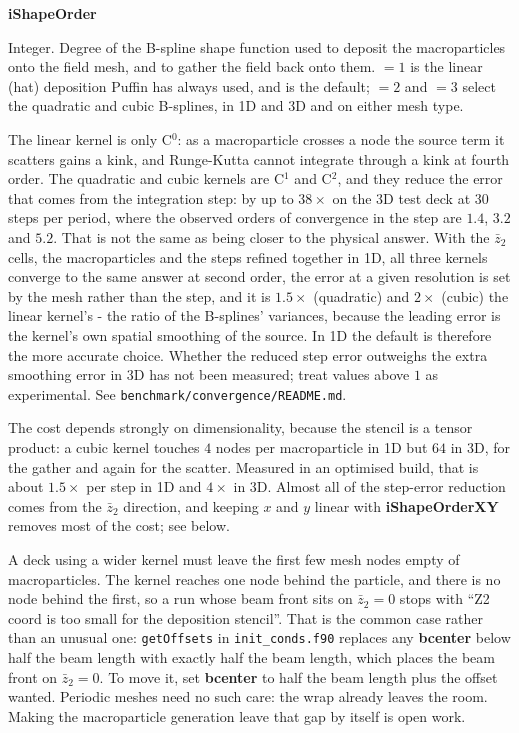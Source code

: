 \documentclass[12pt]{article}%
\begin{document}
{\bf iShapeOrder}

Integer. Degree of the B-spline shape function used to deposit the macroparticles onto the field mesh, and to gather the field back onto them. $=1$ is the linear (hat) deposition Puffin has always used, and is the default; $=2$ and $=3$ select the quadratic and cubic B-splines, in 1D and 3D and on either mesh type.

The linear kernel is only C$^0$: as a macroparticle crosses a node the source term it scatters gains a kink, and Runge-Kutta cannot integrate through a kink at fourth order. The quadratic and cubic kernels are C$^1$ and C$^2$, and they reduce the error that comes from the integration step: by up to $38\times$ on the 3D test deck at $30$ steps per period, where the observed orders of convergence in the step are $1.4$, $3.2$ and $5.2$. That is not the same as being closer to the physical answer. With the $\bar{z}_2$ cells, the macroparticles and the steps refined together in 1D, all three kernels converge to the same answer at second order, the error at a given resolution is set by the mesh rather than the step, and it is $1.5\times$ (quadratic) and $2\times$ (cubic) the linear kernel's - the ratio of the B-splines' variances, because the leading error is the kernel's own spatial smoothing of the source. In 1D the default is therefore the more accurate choice. Whether the reduced step error outweighs the extra smoothing error in 3D has not been measured; treat values above $1$ as experimental. See {\tt benchmark/convergence/README.md}.

The cost depends strongly on dimensionality, because the stencil is a tensor product: a cubic kernel touches $4$ nodes per macroparticle in 1D but $64$ in 3D, for the gather and again for the scatter. Measured in an optimised build, that is about $1.5\times$ per step in 1D and $4\times$ in 3D. Almost all of the step-error reduction comes from the $\bar{z}_2$ direction, and keeping $x$ and $y$ linear with {\bf iShapeOrderXY} removes most of the cost; see below.

A deck using a wider kernel must leave the first few mesh nodes empty of
macroparticles. The kernel reaches one node behind the particle, and there is no
node behind the first, so a run whose beam front sits on $\bar{z}_2 = 0$ stops
with ``Z2 coord is too small for the deposition stencil''. That is the common
case rather than an unusual one: {\tt getOffsets} in {\tt init\_conds.f90}
replaces any {\bf bcenter} below half the beam length with exactly half the beam
length, which places the beam front on $\bar{z}_2 = 0$. To move it, set {\bf
bcenter} to half the beam length plus the offset wanted. Periodic meshes need no
such care: the wrap already leaves the room. Making the macroparticle generation
leave that gap by itself is open work.
\end{document}

